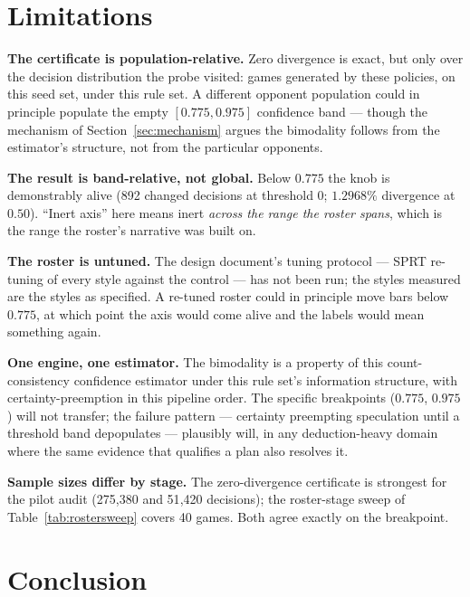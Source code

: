 \documentclass[11pt]{article}
\begin{document}
\section{Limitations}
\label{sec:limitations}

\textbf{The certificate is population-relative.} Zero divergence is exact, but only over the
decision distribution the probe visited: games generated by these policies, on this seed set,
under this rule set. A different opponent population could in principle populate the empty
$[0.775, 0.975]$ confidence band --- though the mechanism of Section~\ref{sec:mechanism} argues the
bimodality follows from the estimator's structure, not from the particular opponents.

\textbf{The result is band-relative, not global.} Below $0.775$ the knob is demonstrably alive
(892 changed decisions at threshold $0$; $1.2968\%$ divergence at $0.50$). ``Inert axis'' here
means inert \emph{across the range the roster spans}, which is the range the roster's narrative
was built on.

\textbf{The roster is untuned.} The design document's tuning protocol --- SPRT re-tuning of every
style against the control --- has not been run; the styles measured are the styles as specified.
A re-tuned roster could in principle move bars below $0.775$, at which point the axis would
come alive and the labels would mean something again.

\textbf{One engine, one estimator.} The bimodality is a property of this count-consistency
confidence estimator under this rule set's information structure, with certainty-preemption in
this pipeline order. The specific breakpoints ($0.775$, $0.975$) will not transfer; the failure
pattern --- certainty preempting speculation until a threshold band depopulates --- plausibly
will, in any deduction-heavy domain where the same evidence that qualifies a plan also resolves
it.

\textbf{Sample sizes differ by stage.} The zero-divergence certificate is strongest for the
pilot audit (275{,}380 and 51{,}420 decisions); the roster-stage sweep of
Table~\ref{tab:rostersweep} covers 40 games. Both agree exactly on the breakpoint.

\section{Conclusion}
\end{document}
